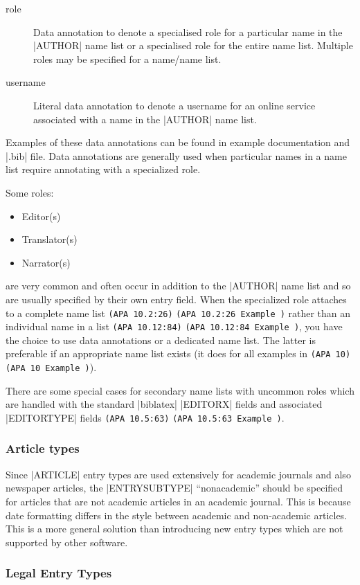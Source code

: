 \documentclass{ltxdockit}
\newcommand\apa[2][]{\ifthenelse{\equal{#1}{}}%
                       {\texttt{(APA #2)}}%
                       {\texttt{(APA #2 Example #1)}}}
\begin{document}
\begin{description}
  \item[role] Data annotation to denote a specialised role for a particular
    name in the |AUTHOR| name list or a specialised role for the entire
    name list. Multiple roles may be specified for a name/name list.
  \item[username] Literal data annotation to denote a username for an
    online service associated with a name in the |AUTHOR| name list.
\end{description}    
%
Examples of these data annotations can be found in example documentation
and |.bib| file. Data annotations are generally used when particular names
in a name list require annotating with a specialized role.

Some roles:

\begin{itemize}
  \item Editor(s)
  \item Translator(s)
  \item Narrator(s)
\end{itemize}
%
are very common and often occur in addition to the |AUTHOR| name list and
so are usually specified by their own entry field. When the specialized
role attaches to a complete name list \apa{10.2:26} rather than
an individual name in a list \apa{10.12:84}, you have the choice
to use data annotations or a dedicated name list. The latter is preferable
if an appropriate name list exists (it does for all examples in \apa{10}).

There are some special cases for secondary name lists with uncommon roles
which are handled with the standard |biblatex| |EDITORX| fields and
associated |EDITORTYPE| fields \apa{10.5:63}.

\subsubsection{Article types}

Since |ARTICLE| entry types are used extensively for academic journals and
also newspaper articles, the |ENTRYSUBTYPE| ``nonacademic'' should be specified
for articles that are not academic articles in an academic journal. This is
because date formatting differs in the style between academic and
non-academic articles. This is a more general solution than introducing new
entry types which are not supported by other software.

\subsubsection{Legal Entry Types}
\end{document}
